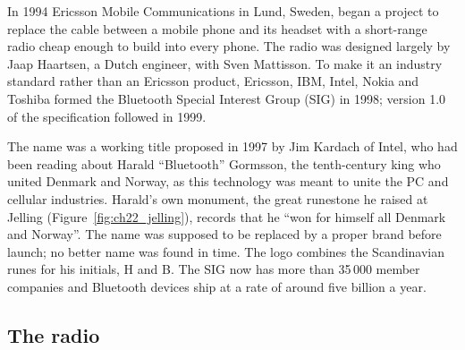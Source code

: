 \begin{history}
In 1994 Ericsson Mobile Communications in Lund, Sweden, began a project to replace the cable between
a mobile phone and its headset with a short-range radio cheap enough to build into every phone. The
radio was designed largely by Jaap Haartsen, a Dutch engineer, with Sven Mattisson. To make it an
industry standard rather than an Ericsson product, Ericsson, IBM, Intel, Nokia and Toshiba formed the
Bluetooth Special Interest Group (SIG) in 1998; version 1.0 of the specification followed in 1999.

The name was a working title proposed in 1997 by Jim Kardach of Intel, who had been reading about
Harald ``Bluetooth'' Gormsson, the tenth-century king who united Denmark and Norway, as this
technology was meant to unite the PC and cellular industries. Harald's own monument, the great
runestone he raised at Jelling (Figure~\ref{fig:ch22_jelling}), records that he ``won for himself all
Denmark and Norway''. The name was supposed to be replaced by a proper brand before launch; no better
name was found in time. The logo combines the Scandinavian runes for his initials, H and B. The SIG
now has more than 35\,000 member companies and Bluetooth devices ship at a rate of around five
billion a year.
\end{history}


\subsection{The radio}

